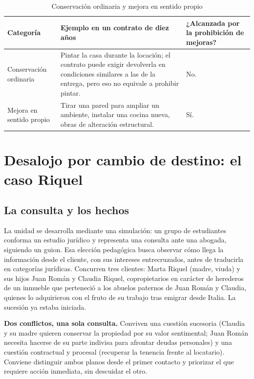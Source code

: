 \documentclass[12pt,oneside]{book}
\begin{document}
\begin{table}[H]
\centering
\caption{Conservación ordinaria y mejora en sentido propio}
\begin{tabularx}{\textwidth}{>{\raggedright\arraybackslash}p{} X >{\raggedright\arraybackslash}p{}}
\toprule
\textbf{Categoría} & \textbf{Ejemplo en un contrato de diez años} & \textbf{¿Alcanzada por la prohibición de mejoras?} \\
\midrule
Conservación ordinaria & Pintar la casa durante la locación; el contrato puede exigir devolverla en condiciones similares a las de la entrega, pero eso no equivale a prohibir pintar. & No. \\
Mejora en sentido propio & Tirar una pared para ampliar un ambiente, instalar una cocina nueva, obras de alteración estructural. & Sí. \\
\bottomrule
\end{tabularx}
\end{table}

\section{Desalojo por cambio de destino: el caso Riquel}

\subsection{La consulta y los hechos}

La unidad se desarrolla mediante una simulación: un grupo de estudiantes conforma un estudio jurídico y representa una consulta ante una abogada, siguiendo un guion. Esa elección pedagógica busca observar cómo llega la información desde el cliente, con sus intereses entrecruzados, antes de traducirla en categorías jurídicas. Concurren tres clientes: Marta Riquel (madre, viuda) y sus hijos Juan Román y Claudia Riquel, copropietarios en carácter de herederos de un inmueble que perteneció a los abuelos paternos de Juan Román y Claudia, quienes lo adquirieron con el fruto de su trabajo tras emigrar desde Italia. La sucesión ya estaba iniciada.

\begin{important}
\textbf{Dos conflictos, una sola consulta.} Conviven una cuestión sucesoria (Claudia y su madre quieren conservar la propiedad por su valor sentimental; Juan Román necesita hacerse de su parte indivisa para afrontar deudas personales) y una cuestión contractual y procesal (recuperar la tenencia frente al locatario). Conviene distinguir ambos planos desde el primer contacto y priorizar el que requiere acción inmediata, sin descuidar el otro.
\end{important}
\end{document}
